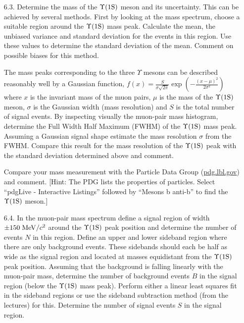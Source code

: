 \begin{enumerate}


\item [6.3.] Determine the mass of the $\Upsilon \rm (1S)$ meson and its uncertainty.
This can be achieved by several methods.
First by looking at the mass spectrum, choose a suitable region around the $\Upsilon \rm (1S)$ mass peak.
Calculate the mean, the unbiased variance and standard deviation for the events in this region.
Use these values to determine the standard deviation of the mean.
Comment on possible biases for this method.

The mass peaks corresponding to the three $\Upsilon$ mesons can be described reasonably well by a Gaussian function,
$f(x) = \frac{S}{\sigma \sqrt{2\pi}} \exp{\left( -\frac{(x-\mu)^2}{2\sigma^2} \right)}$
where $x$ is the invariant mass of the muon pairs, $\mu$ is the mass of the $\Upsilon \rm (1S)$ meson, $\sigma$ is the Gaussian width (mass resolution) and $S$ is the total number of signal events. 
By inspecting visually the muon-pair mass histogram, determine the Full Width Half Maximum (FWHM) of the $\Upsilon \rm (1S)$ mass peak.
Assuming a Gaussian signal shape estimate the mass resolution $\sigma$ from the FWHM. %
Compare this result for the mass resolution of the $\Upsilon \rm (1S)$ peak with the standard deviation determined above and comment.

Compare your mass measurement with the Particle Data Group (\url{pdg.lbl.gov}) and comment.
[Hint: The PDG lists the properties of particles. Select ``pdgLive - Interactive Listings'' followed by ``Mesons b anti-b'' to find the $\Upsilon \rm (1S)$ meson.]



\item [6.4.] In the muon-pair mass spectrum define a signal region of width $\pm 150\; {\rm MeV}/c^2$ around the $\Upsilon \rm (1S)$ peak position and determine the number of events $N$ in this region.
Define an upper and lower sideband region where there are only background events.
These sidebands should each be half as wide as the signal region and located at masses equidistant from the $\Upsilon \rm (1S)$ peak position.
Assuming that the background is falling linearly with the muon-pair mass, determine the number of background events $B$ in the signal region (below the $\Upsilon \rm (1S)$ mass peak).
Perform either a linear least squares fit in the sideband regions or use the sideband subtraction method (from the lectures) for this.
Determine the number of signal events $S$ in the signal region.


\end{enumerate}
